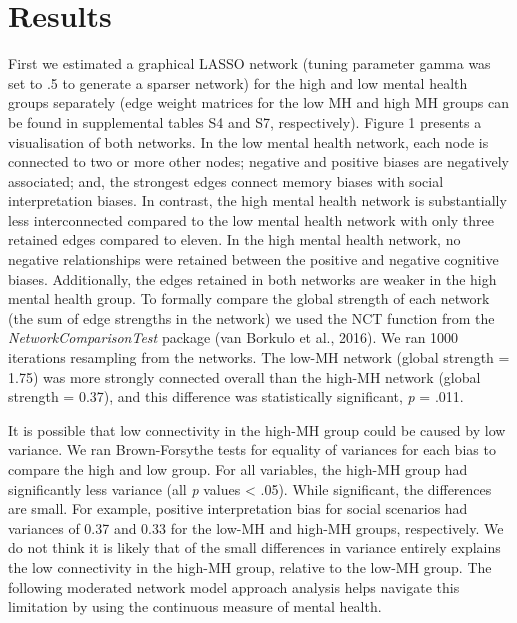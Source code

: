 \documentclass[
  english,
  man,floatsintext]{apa6}
\begin{document}
\hypertarget{results}{%
\section{Results}\label{results}}

First we estimated a graphical LASSO network (tuning parameter gamma was set to .5 to generate a sparser network) for the high and low mental health groups separately (edge weight matrices for the low MH and high MH groups can be found in supplemental tables S4 and S7, respectively). Figure 1 presents a visualisation of both networks. In the low mental health network, each node is connected to two or more other nodes; negative and positive biases are negatively associated; and, the strongest edges connect memory biases with social interpretation biases. In contrast, the high mental health network is substantially less interconnected compared to the low mental health network with only three retained edges compared to eleven. In the high mental health network, no negative relationships were retained between the positive and negative cognitive biases. Additionally, the edges retained in both networks are weaker in the high mental health group. To formally compare the global strength of each network (the sum of edge strengths in the network) we used the NCT function from the \emph{NetworkComparisonTest} package (van Borkulo et al., 2016). We ran 1000 iterations resampling from the networks. The low-MH network (global strength = 1.75) was more strongly connected overall than the high-MH network (global strength = 0.37), and this difference was statistically significant, \emph{p} = .011.

It is possible that low connectivity in the high-MH group could be caused by low variance. We ran Brown-Forsythe tests for equality of variances for each bias to compare the high and low group. For all variables, the high-MH group had significantly less variance (all \emph{p} values \textless{} .05). While significant, the differences are small. For example, positive interpretation bias for social scenarios had variances of 0.37 and 0.33 for the low-MH and high-MH groups, respectively. We do not think it is likely that of the small differences in variance entirely explains the low connectivity in the high-MH group, relative to the low-MH group. The following moderated network model approach analysis helps navigate this limitation by using the continuous measure of mental health.
\end{document}
